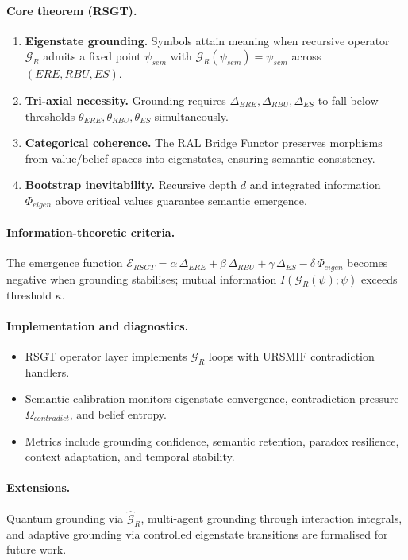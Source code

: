 \documentclass[12pt]{article}
\begin{document}
\paragraph{Core theorem (RSGT).}
\begin{enumerate}
\item \textbf{Eigenstate grounding.} Symbols attain meaning when recursive operator $\mathcal{G}_R$ admits a fixed point $\psi_{sem}$ with $\mathcal{G}_R(\psi_{sem}) = \psi_{sem}$ across $(ERE,RBU,ES)$.
\item \textbf{Tri-axial necessity.} Grounding requires $\Delta_{ERE},\Delta_{RBU},\Delta_{ES}$ to fall below thresholds $\theta_{ERE},\theta_{RBU},\theta_{ES}$ simultaneously.
\item \textbf{Categorical coherence.} The RAL Bridge Functor preserves morphisms from value/belief spaces into eigenstates, ensuring semantic consistency.
\item \textbf{Bootstrap inevitability.} Recursive depth $d$ and integrated information $\Phi_{eigen}$ above critical values guarantee semantic emergence.
\end{enumerate}

\paragraph{Information-theoretic criteria.}
The emergence function $\mathcal{E}_{RSGT} = \alpha\,\Delta_{ERE} + \beta\,\Delta_{RBU} + \gamma\,\Delta_{ES} - \delta\,\Phi_{eigen}$ becomes negative when grounding stabilises; mutual information $I(\mathcal{G}_R(\psi); \psi)$ exceeds threshold $\kappa$.

\paragraph{Implementation and diagnostics.}
\begin{itemize}
\item RSGT operator layer implements $\mathcal{G}_R$ loops with URSMIF contradiction handlers.
\item Semantic calibration monitors eigenstate convergence, contradiction pressure $\Omega_{contradict}$, and belief entropy.
\item Metrics include grounding confidence, semantic retention, paradox resilience, context adaptation, and temporal stability.
\end{itemize}

\paragraph{Extensions.}
Quantum grounding via $\hat{\mathcal{G}}_R$, multi-agent grounding through interaction integrals, and adaptive grounding via controlled eigenstate transitions are formalised for future work.
\end{document}
